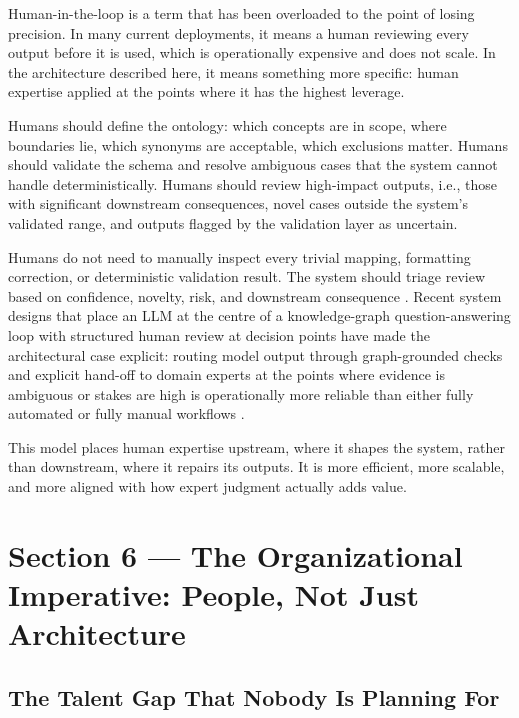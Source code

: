 \documentclass[man,12pt,donotrepeattitle]{apa7}
\begin{document}
Human-in-the-loop is a term that has been overloaded to the point of losing
precision. In many current deployments, it means a human reviewing every
output before it is used, which is operationally expensive and does not
scale. In the architecture described here, it means something more specific:
human expertise applied at the points where it has the highest leverage.

Humans should define the ontology: which concepts are in scope, where
boundaries lie, which synonyms are acceptable, which exclusions matter.
Humans should validate the schema and resolve ambiguous cases that the
system cannot handle deterministically. Humans should review high-impact
outputs, i.e., those with significant downstream consequences, novel cases
outside the system's validated range, and outputs flagged by the validation
layer as uncertain.

Humans do not need to manually inspect every trivial mapping, formatting
correction, or deterministic validation result. The system should triage
review based on confidence, novelty, risk, and downstream consequence
\parencite{garciafernandez2025,tsaneva2025,manzoor2022}. Recent system
designs that place an LLM at the centre of a knowledge-graph
question-answering loop with structured human review at decision points have
made the architectural case explicit: routing model output through
graph-grounded checks and explicit hand-off to domain experts at the points
where evidence is ambiguous or stakes are high is operationally more
reliable than either fully automated or fully manual workflows
\parencite{pusch2026}.

This model places human expertise upstream, where it shapes the system,
rather than downstream, where it repairs its outputs. It is more efficient,
more scalable, and more aligned with how expert judgment actually adds value.


\section{Section 6 --- The Organizational Imperative: People, Not Just Architecture}

\subsection{The Talent Gap That Nobody Is Planning For}
\end{document}
